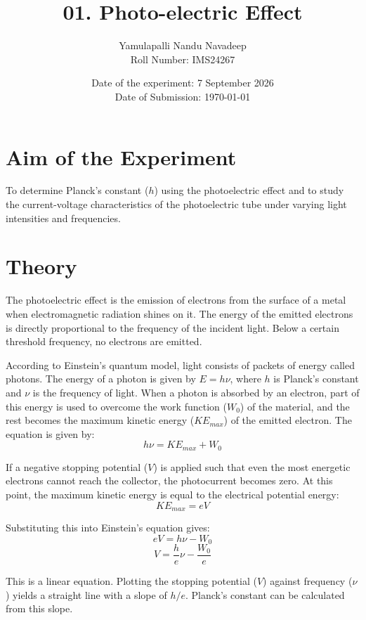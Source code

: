 \documentclass[12pt, a4paper]{article}
\title{\textbf{01. Photo-electric Effect}}
\author{Yamulapalli Nandu Navadeep \\ Roll Number: IMS24267}
\date{Date of the experiment: 7 September 2026 \\ Date of Submission: \today}
\begin{document}
\maketitle


\section{Aim of the Experiment}
To determine Planck's constant ($h$) using the photoelectric effect and to study the current-voltage characteristics of the photoelectric tube under varying light intensities and frequencies.

\section{Theory}
The photoelectric effect is the emission of electrons from the surface of a metal when electromagnetic radiation shines on it. The energy of the emitted electrons is directly proportional to the frequency of the incident light. Below a certain threshold frequency, no electrons are emitted.

According to Einstein's quantum model, light consists of packets of energy called photons. The energy of a photon is given by $E = h \nu$, where $h$ is Planck's constant and $\nu$ is the frequency of light. When a photon is absorbed by an electron, part of this energy is used to overcome the work function ($W_0$) of the material, and the rest becomes the maximum kinetic energy ($KE_{max}$) of the emitted electron.
The equation is given by:
\begin{equation}
    h \nu = KE_{max} + W_0
\end{equation}

If a negative stopping potential ($V$) is applied such that even the most energetic electrons cannot reach the collector, the photocurrent becomes zero. At this point, the maximum kinetic energy is equal to the electrical potential energy:
\begin{equation}
    KE_{max} = e V
\end{equation}

Substituting this into Einstein's equation gives:
\begin{equation}
    e V = h \nu - W_0
\end{equation}
\begin{equation}
    V = \frac{h}{e} \nu - \frac{W_0}{e}
\end{equation}

This is a linear equation. Plotting the stopping potential ($V$) against frequency ($\nu$) yields a straight line with a slope of $h/e$. Planck's constant can be calculated from this slope.
\end{document}
